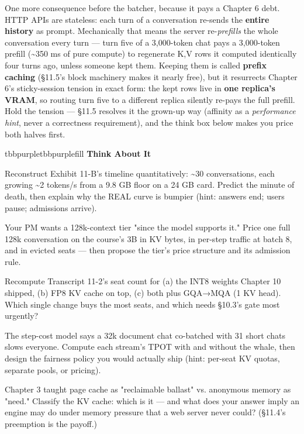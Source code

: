 One more consequence before the batcher, because it pays a Chapter 6 debt. HTTP APIs are stateless: each turn of a conversation re-sends the \textbf{entire history} as prompt. Mechanically that means the server re-\textit{prefills} the whole conversation every turn — turn five of a 3,000-token chat pays a 3,000-token prefill (\textasciitilde{}350 ms of pure compute) to regenerate K,V rows it computed identically four turns ago, unless someone kept them. Keeping them is called \textbf{prefix caching} (§11.5's block machinery makes it nearly free), but it resurrects Chapter 6's sticky-session tension in exact form: the kept rows live in \textbf{one replica's VRAM}, so routing turn five to a different replica silently re-pays the full prefill. Hold the tension — §11.5 resolves it the grown-up way (affinity as a \textit{performance hint}, never a correctness requirement), and the think box below makes you price both halves first.

\begin{calloutbox}{tbbpurple}{tbbpurplefill}
{\normalsize\bfseries\color{tbbpurple}Think About It}\par\vspace{3pt}
\begin{tbbitemize}
  \item Reconstruct Exhibit 11-B's timeline quantitatively: \textasciitilde{}30 conversations, each growing \textasciitilde{}2 tokens/s from a 9.8 GB floor on a 24 GB card. Predict the minute of death, then explain why the REAL curve is bumpier (hint: answers end; users pause; admissions arrive).
  \item Your PM wants a 128k-context tier "since the model supports it." Price one full 128k conversation on the course's 3B in KV bytes, in per-step traffic at batch 8, and in evicted seats — then propose the tier's price structure and its admission rule.
  \item Recompute Transcript 11-2's seat count for (a) the INT8 weights Chapter 10 shipped, (b) FP8 KV cache on top, (c) both plus GQA→MQA (1 KV head). Which single change buys the most seats, and which needs §10.3's gate most urgently?
  \item The step-cost model says a 32k document chat co-batched with 31 short chats slows everyone. Compute each stream's TPOT with and without the whale, then design the fairness policy you would actually ship (hint: per-seat KV quotas, separate pools, or pricing).
  \item Chapter 3 taught page cache as "reclaimable ballast" vs. anonymous memory as "need." Classify the KV cache: which is it — and what does your answer imply an engine may do under memory pressure that a web server never could? (§11.4's preemption is the payoff.)
\end{tbbitemize}
\end{calloutbox}

